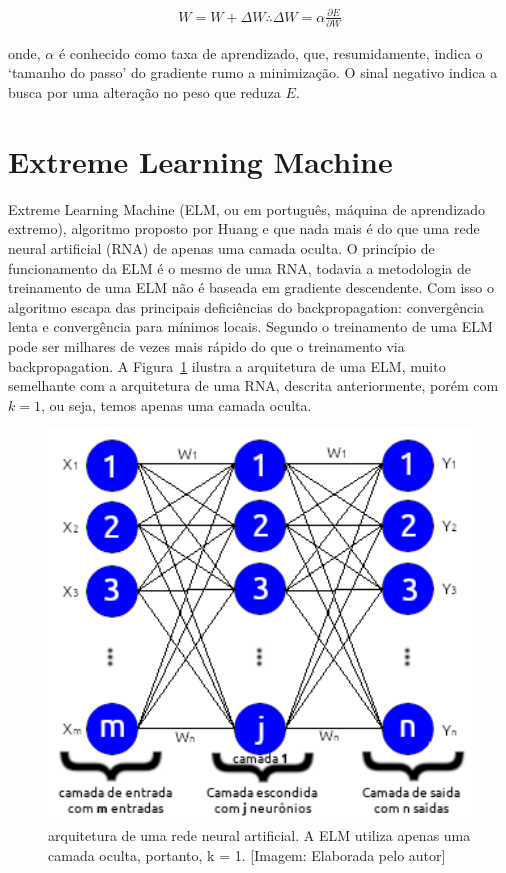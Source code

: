 \begin{equation} \label{eq4}
\begin{split}
W = W + \Delta W \therefore \Delta W = \alpha\frac{\partial E}{\partial W}
\end{split}
\end{equation}

onde, \(\alpha\) é conhecido como taxa de aprendizado, que, resumidamente, indica o ‘tamanho do passo’ do gradiente rumo a minimização. O sinal negativo indica a busca por uma alteração no peso que reduza \(E\).

\section{Extreme Learning Machine}

Extreme Learning Machine (ELM, ou em português, máquina de aprendizado extremo), algoritmo proposto por Huang \cite{1380068, HUANG2006489} e que nada mais é do que uma rede neural artificial (RNA) de apenas uma camada oculta. O princípio de funcionamento da ELM é o mesmo de uma RNA, todavia a metodologia de treinamento de uma ELM não é baseada em gradiente descendente. Com isso o algoritmo escapa das principais deficiências do backpropagation: convergência lenta e convergência para mínimos locais. Segundo \cite{HUANG2006489} o treinamento de uma ELM pode ser milhares de vezes mais rápido do que o treinamento via backpropagation. A Figura~\ref{figredeextreme} ilustra a arquitetura de uma ELM, muito semelhante com a arquitetura de uma RNA, descrita anteriormente, porém com \(k = 1\), ou seja, temos apenas uma camada oculta.

\begin{figure}[ht]
\centering
\includegraphics[width=1\textwidth,height=.75\textwidth]{figuras/extreme_learning_machine.png}
\caption{arquitetura de uma rede neural artificial. A ELM utiliza apenas uma camada oculta, portanto, k = 1. [Imagem: Elaborada pelo autor]}
\label{figredeextreme}
\end{figure}

